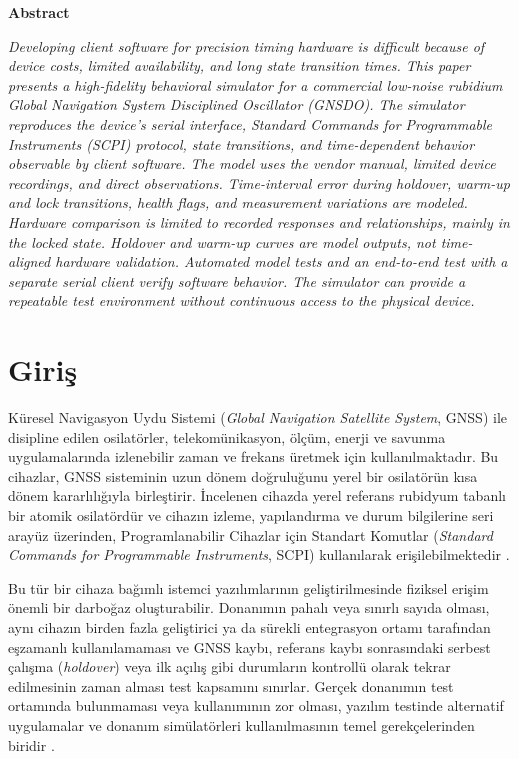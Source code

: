 \documentclass[9pt,twocolumn,a4paper]{extarticle}
\begin{document}
\vspace{9pt}
\begin{center}
  {\fontsize{10}{10.8}\selectfont\bfseries Abstract\par}
\end{center}
\vspace{-6pt}
{\fontsize{9}{10.8}\selectfont\itshape
\noindent Developing client software for precision timing hardware is difficult because of device costs, limited availability, and long state transition times. This paper presents a high-fidelity behavioral simulator for a commercial low-noise rubidium Global Navigation System Disciplined Oscillator (GNSDO). The simulator reproduces the device's serial interface, Standard Commands for Programmable Instruments (SCPI) protocol, state transitions, and time-dependent behavior observable by client software. The model uses the vendor manual, limited device recordings, and direct observations. Time-interval error during holdover, warm-up and lock transitions, health flags, and measurement variations are modeled. Hardware comparison is limited to recorded responses and relationships, mainly in the locked state. Holdover and warm-up curves are model outputs, not time-aligned hardware validation. Automated model tests and an end-to-end test with a separate serial client verify software behavior. The simulator can provide a repeatable test environment without continuous access to the physical device.\par}

\section{Giriş}
Küresel Navigasyon Uydu Sistemi (\emph{Global Navigation Satellite System}, GNSS) ile disipline edilen osilatörler, telekomünikasyon, ölçüm, enerji ve savunma uygulamalarında izlenebilir zaman ve frekans üretmek için kullanılmaktadır. Bu cihazlar, GNSS sisteminin uzun dönem doğruluğunu yerel bir osilatörün kısa dönem kararlılığıyla birleştirir. İncelenen cihazda yerel referans rubidyum tabanlı bir atomik osilatördür ve cihazın izleme, yapılandırma ve durum bilgilerine seri arayüz üzerinden, Programlanabilir Cihazlar için Standart Komutlar (\emph{Standard Commands for Programmable Instruments}, SCPI) kullanılarak erişilebilmektedir \cite{jlt2015,scpi1999}.

Bu tür bir cihaza bağımlı istemci yazılımlarının geliştirilmesinde fiziksel erişim önemli bir darboğaz oluşturabilir. Donanımın pahalı veya sınırlı sayıda olması, aynı cihazın birden fazla geliştirici ya da sürekli entegrasyon ortamı tarafından eşzamanlı kullanılamaması ve GNSS kaybı, referans kaybı sonrasındaki serbest çalışma (\emph{holdover}) veya ilk açılış gibi durumların kontrollü olarak tekrar edilmesinin zaman alması test kapsamını sınırlar. Gerçek donanımın test ortamında bulunmaması veya kullanımının zor olması, yazılım testinde alternatif uygulamalar ve donanım simülatörleri kullanılmasının temel gerekçelerinden biridir \cite{meszaros2007,morita2017}.
\end{document}
